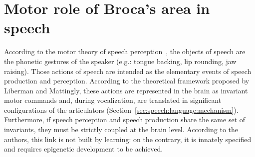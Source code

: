 \section{Motor role of Broca's area in speech}
\label{sec:speech:mirror}
According to the motor theory of speech
perception~\citep{liberman.mattingly:1985}, the objects of speech are the 
phonetic gestures of the speaker (e.g.: tongue backing, lip rounding, jaw
raising).
Those actions of speech are intended as the elementary events of speech
production and perception. 
According to the theoretical framework proposed by Liberman and Mattingly, these
actions are represented in the brain as invariant motor commands 
and, during vocalization, are translated in significant configurations of the
articulators (Section~\ref{sec:speech:language:mechanism}).
Furthermore, if speech perception and speech production share the same set of
invariants, they must be strictly coupled at the brain level.
According to the authors, this link is not built by learning: on the contrary, 
it is innately specified and requires epigenetic development to be achieved.

